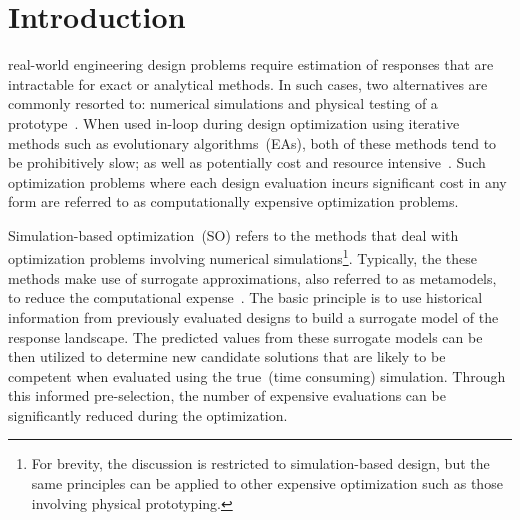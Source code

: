 \documentclass[journal]{IEEEtran}
\begin{document}
\section{Introduction}
% 
% 
% 
% 

 real-world engineering design problems require estimation of responses that are intractable for exact or analytical methods. In such cases, two alternatives are commonly resorted to: numerical simulations and physical testing of a prototype~\cite{forrester2008engineering}. When used in-loop during design optimization using iterative methods such as evolutionary algorithms~(EAs), both of these methods tend to be prohibitively slow; as well as potentially cost and resource intensive~\cite{jin2009systems}. Such optimization problems where each design evaluation incurs significant cost in any form are referred to as computationally expensive optimization problems.

Simulation-based optimization~(SO) refers to the methods that deal with optimization problems involving  numerical simulations\footnote{For brevity, the discussion is restricted to simulation-based design, but the same principles can be applied to other expensive optimization such as those involving physical prototyping.}. Typically, the these methods make use of surrogate approximations, also referred to as metamodels, to reduce the computational expense~\cite{amaran2016simulation}. The basic principle is to use historical information from previously evaluated designs to build a surrogate model of the response landscape. The predicted values from these surrogate models can be then utilized to determine new candidate solutions that are likely to be competent when evaluated using the true~(time consuming) simulation. Through this informed pre-selection, the number of expensive evaluations can be significantly reduced during the optimization. 

\end{document}
